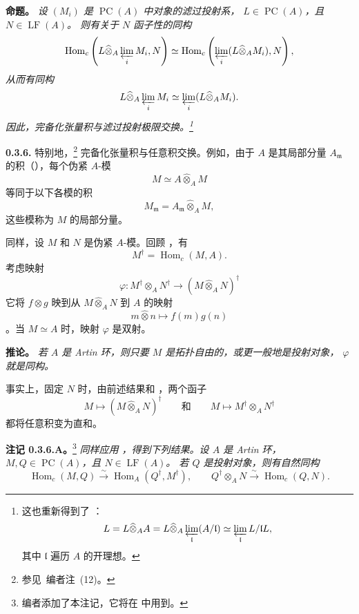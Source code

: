 \medskip
\noindent\textbf{命题。}
\label{sga3:VIIB:0.3.5-proposition}
{\itshape 设 \((M_i)\) 是 \(\operatorname{PC}(A)\) 中对象的滤过投射系，
\(L\in\operatorname{PC}(A)\)，且 \(N\in\operatorname{LF}(A)\)。
则有关于 \(N\) 函子性的同构
\[
  \operatorname{Hom}_c
    \left(L\widehat{\otimes}_A\varprojlim_iM_i,N\right)
  \simeq
  \operatorname{Hom}_c
    \left(\varprojlim_i(L\widehat{\otimes}_A M_i),N\right),
\]
从而有同构
\[
  L\widehat{\otimes}_A\varprojlim_iM_i
  \simeq
  \varprojlim_i(L\widehat{\otimes}_A M_i).
\]
因此，完备化张量积与滤过投射极限交换。\footnote{这也重新得到了 ：
\[
  L=L\widehat{\otimes}_A A
  =
  L\widehat{\otimes}_A
    \varprojlim_{\mathfrak l}(A/\mathfrak l)
  \simeq
  \varprojlim_{\mathfrak l}L/\mathfrak lL,
\]
其中 \(\mathfrak l\) 遍历 \(A\) 的开理想。}}

\medskip
\noindent\textbf{0.3.6.}
\label{sga3:VIIB:0.3.6}
特别地，\footnote{参见\ 编者注~(12)。} 完备化张量积与任意积交换。例如，由于 \(A\) 是其局部分量
\(A_{\mathfrak m}\) 的积（），每个伪紧 \(A\)-模
\[
  M\simeq A\widehat{\otimes}_A M
\]
等同于以下各模的积
\[
  M_{\mathfrak m}
  =
  A_{\mathfrak m}\widehat{\otimes}_A M,
\]
这些模称为 \(M\) 的局部分量。

同样，设 \(M\) 和 \(N\) 是伪紧 \(A\)-模。回顾 ，有
\[
  M^\dagger=\operatorname{Hom}_c(M,A).
\]
考虑映射
\[
  \varphi:
  M^\dagger\otimes_A N^\dagger
  \longrightarrow
  (M\widehat{\otimes}_A N)^\dagger
\]
它将 \(f\otimes g\) 映到从 \(M\widehat{\otimes}_A N\) 到 \(A\) 的映射
\[
  m\widehat{\otimes}n\longmapsto f(m)g(n)
\]
。当 \(M\simeq A\) 时，映射 \(\varphi\) 是双射。

\medskip
\noindent\textbf{推论。}
\label{sga3:VIIB:0.3.6-corollary}
\textit{若 \(A\) 是 Artin 环，则只要 \(M\) 是拓扑自由的，或更一般地是投射对象，
\(\varphi\) 就是同构。}

事实上，固定 \(N\) 时，由前述结果和 ，两个函子
\[
  M\longmapsto(M\widehat{\otimes}_A N)^\dagger
  \qquad\text{和}\qquad
  M\longmapsto M^\dagger\otimes_A N^\dagger
\]
都将任意积变为直和。

\medskip
\noindent\textbf{注记 0.3.6.A。}\footnote{编者添加了本注记，它将在  中用到。}
\label{sga3:VIIB:0.3.6.A}
\textit{同样应用 ，得到下列结果。设 \(A\) 是 Artin 环，
\(M,Q\in\operatorname{PC}(A)\)，且 \(N\in\operatorname{LF}(A)\)。
若 \(Q\) 是投射对象，则有自然同构}
\[
  \operatorname{Hom}_c(M,Q)
  \xrightarrow{\sim}
  \operatorname{Hom}_A(Q^\dagger,M^\dagger),
  \qquad
  Q^\dagger\otimes_A N
  \xrightarrow{\sim}
  \operatorname{Hom}_c(Q,N).
\]

